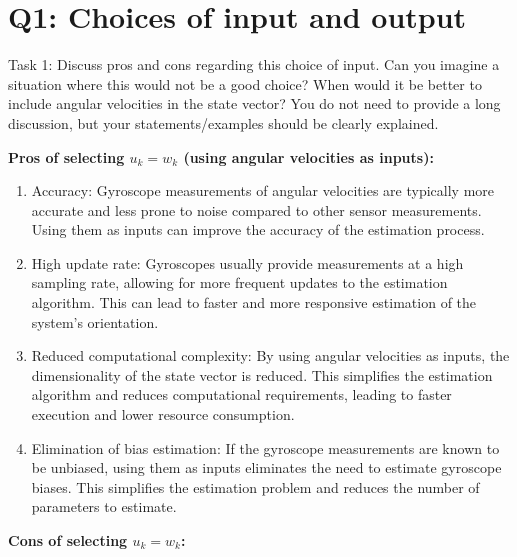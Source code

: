 \section{Q1: Choices of input and output}

Task 1: Discuss pros and cons regarding this choice of input. Can you
imagine a situation where this would not be a good choice? When would
it be better to include angular velocities in the state vector? You do not
need to provide a long discussion, but your statements/examples should
be clearly explained.


\textbf{Pros of selecting $u_k = w_k$ (using angular velocities as inputs):}

\begin{enumerate}
  \item Accuracy: Gyroscope measurements of angular velocities are typically more accurate and less prone to noise compared to other sensor measurements. Using them as inputs can improve the accuracy of the estimation process.
  
  \item High update rate: Gyroscopes usually provide measurements at a high sampling rate, allowing for more frequent updates to the estimation algorithm. This can lead to faster and more responsive estimation of the system's orientation.
  
  \item Reduced computational complexity: By using angular velocities as inputs, the dimensionality of the state vector is reduced. This simplifies the estimation algorithm and reduces computational requirements, leading to faster execution and lower resource consumption.
  
  \item Elimination of bias estimation: If the gyroscope measurements are known to be unbiased, using them as inputs eliminates the need to estimate gyroscope biases. This simplifies the estimation problem and reduces the number of parameters to estimate.
\end{enumerate}

\textbf{Cons of selecting $u_k = w_k$:}

